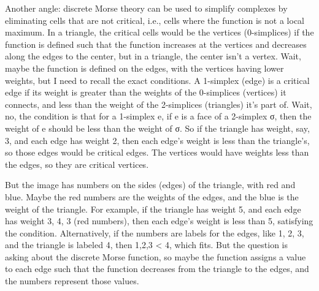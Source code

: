 Another angle: discrete Morse theory can be used to simplify complexes by eliminating cells that are not critical, i.e., cells where the function is not a local maximum. In a triangle, the critical cells would be the vertices (0-simplices) if the function is defined such that the function increases at the vertices and decreases along the edges to the center, but in a triangle, the center isn't a vertex. Wait, maybe the function is defined on the edges, with the vertices having lower weights, but I need to recall the exact conditions. A 1-simplex (edge) is a critical edge if its weight is greater than the weights of the 0-simplices (vertices) it connects, and less than the weight of the 2-simplices (triangles) it's part of. Wait, no, the condition is that for a 1-simplex e, if e is a face of a 2-simplex σ, then the weight of e should be less than the weight of σ. So if the triangle has weight, say, 3, and each edge has weight 2, then each edge's weight is less than the triangle's, so those edges would be critical edges. The vertices would have weights less than the edges, so they are critical vertices.

But the image has numbers on the sides (edges) of the triangle, with red and blue. Maybe the red numbers are the weights of the edges, and the blue is the weight of the triangle. For example, if the triangle has weight 5, and each edge has weight 3, 4, 3 (red numbers), then each edge's weight is less than 5, satisfying the condition. Alternatively, if the numbers are labels for the edges, like 1, 2, 3, and the triangle is labeled 4, then 1,2,3 < 4, which fits. But the question is asking about the discrete Morse function, so maybe the function assigns a value to each edge such that the function decreases from the triangle to the edges, and the numbers represent those values.

